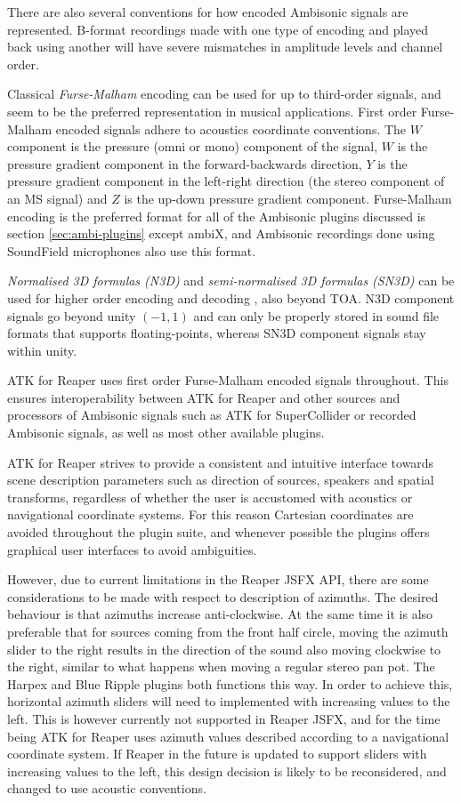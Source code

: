 \documentclass{article}
\begin{document}
There are also several conventions for how encoded Ambisonic signals are represented.
B-format recordings made with one type of encoding and played back using another will have severe mismatches in amplitude levels and channel order.

Classical \emph{Furse-Malham} encoding can be used for up to third-order signals, and seem to be the preferred representation in musical applications.
First order Furse-Malham encoded signals adhere to acoustics coordinate conventions.
The $W$ component is the pressure (omni or mono) component of the signal, $W$ is the pressure gradient component in the forward-backwards direction, $Y$ is the pressure gradient component in the left-right direction (the stereo component of an MS signal) and $Z$ is the up-down pressure gradient component.
Furse-Malham encoding is the preferred format for all of the Ambisonic plugins discussed is section \ref{sec:ambi-plugins} except ambiX, and Ambisonic recordings done using SoundField microphones also use this format.

\emph{Normalised 3D formulas (N3D)} and \emph{semi-normalised 3D formulas (SN3D)} can be used for higher order encoding and decoding  \cite{daniel:2001phd}, also beyond TOA.
N3D component signals go beyond unity $(-1, 1)$ and can only be properly stored in sound file formats that supports floating-points, whereas SN3D component signals stay within unity. 

ATK for Reaper uses first order Furse-Malham encoded signals throughout.
This ensures interoperability between ATK for Reaper and other sources and processors of Ambisonic signals such as ATK for SuperCollider or recorded Ambisonic signals, as well as most other available plugins.

ATK for Reaper strives to provide a consistent and intuitive interface towards scene description parameters such as direction of sources, speakers and spatial transforms, regardless of whether the user is accustomed with acoustics or navigational coordinate systems.
For this reason Cartesian coordinates are avoided throughout the plugin suite, and whenever possible the plugins offers graphical user interfaces to avoid ambiguities.

However, due to current limitations in the Reaper JSFX API, there are some considerations to be made with respect to description of azimuths.
The desired behaviour is that azimuths increase anti-clockwise.
At the same time it is also preferable that for sources coming from the front half circle, moving the azimuth slider to the right results in the direction of the sound also moving clockwise to the right, similar to what happens when moving a regular stereo pan pot.
The Harpex and Blue Ripple plugins both functions this way.
In order to achieve this, horizontal azimuth sliders will need to implemented with increasing values to the left.
This is however currently not supported in Reaper JSFX, and for the time being ATK for Reaper uses azimuth values described according to a navigational coordinate system.
If Reaper in the future is updated to support sliders with increasing values to the left, this design decision is likely to be reconsidered, and changed to use acoustic conventions.
\end{document}
